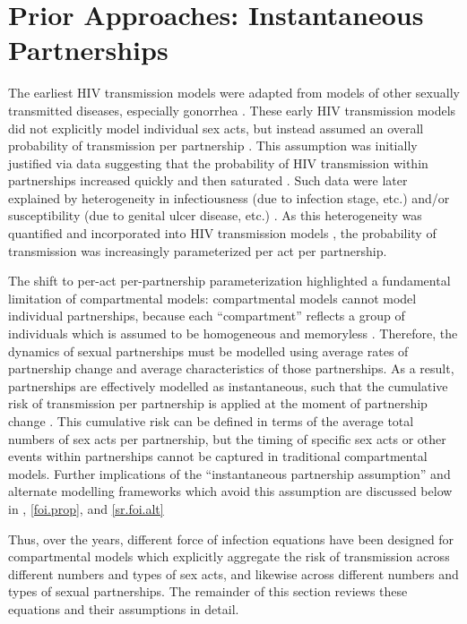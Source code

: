 \section{Prior Approaches: Instantaneous Partnerships}\label{foi.prior}
The earliest HIV transmission models \cite{Anderson1986}
were adapted from models of other sexually transmitted diseases,
especially gonorrhea \cite{Yorke1978,Nold1980,Hethcote1982}.
These early HIV transmission models did not explicitly model individual sex acts,
but instead assumed an overall probability of transmission per partnership \cite{Isham1988}.
This assumption was initially justified via data suggesting that
the probability of HIV transmission within partnerships
increased quickly and then saturated \cite{Kaplan1990}.
Such data were later explained by heterogeneity in
infectiousness (\eg due to infection stage, etc.) and/or
susceptibility (\eg due to genital ulcer disease, etc.)
\cite{Gray2001,Rottingen2002,Boily2009}.
As this heterogeneity was quantified \cite{Gray2001}
and incorporated into HIV transmission models \cite{Moghadas2003},
the probability of transmission was increasingly parameterized per act \vs per partnership.
\par
The shift to per-act \vs per-partnership parameterization highlighted
a fundamental limitation of compartmental models:
compartmental models cannot model individual partnerships,
because each ``compartment'' reflects a group of individuals
which is assumed to be homogeneous and memoryless \cite{Rao2021}.
Therefore, the dynamics of sexual partnerships must be modelled using
average rates of partnership change and average characteristics of those partnerships.
As a result, partnerships are effectively modelled as instantaneous, such that
the cumulative risk of transmission per partnership
is applied at the moment of partnership change \cite{Dietz1988sti}.
This cumulative risk can be defined in terms of
the average total numbers of sex acts per partnership,
but the timing of specific sex acts or other events within partnerships
cannot be captured in traditional compartmental models.
Further implications of the ``instantaneous partnership assumption''
and alternate modelling frameworks which avoid this assumption
are discussed below in , \ref{foi.prop}, and \ref{sr.foi.alt}
\par
Thus, over the years, different force of infection equations
have been designed for compartmental models which
explicitly aggregate the risk of transmission across different numbers and types of sex acts,
and likewise across different numbers and types of sexual partnerships.
The remainder of this section reviews these equations and their assumptions in detail.

